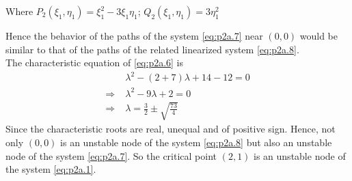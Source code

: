 \documentclass[../main-sheet.tex]{subfiles}
\begin{document}
\begin{soln}[a]
\begin{enumerate}[label=(\roman*)]
        Where \(P_2(\xi_1,\eta_1)=\xi_1^2-3\xi_1\eta_1\); \(Q_2(\xi_1,\eta_1)=3\eta_1^2\)
    \end{enumerate}
    Hence the behavior of the paths of the system \eqref{eq:p2a.7} near \((0,0)\) would be similar to that of the paths of the related linearized system \eqref{eq:p2a.8}.\\
    The characteristic equation of \eqref{eq:p2a.6} is
    \begin{align*}
        &\lambda^2-(2+7)\lambda+14-12=0\\
        \Rightarrow\;&\lambda^2-9\lambda+2=0\\
        \Rightarrow\;&\lambda=\frac{3}{2}\pm\sqrt{\frac{73}{4}}
    \end{align*}
    Since the characteristic roots are real, unequal and of positive sign. Hence, not only \((0,0)\) is an unstable node of the system \eqref{eq:p2a.8} but also an unstable node of the system \eqref{eq:p2a.7}. So the critical
    point \((2,1)\) is an unstable node of the system \eqref{eq:p2a.1}.\\



\end{soln}
\end{document}
